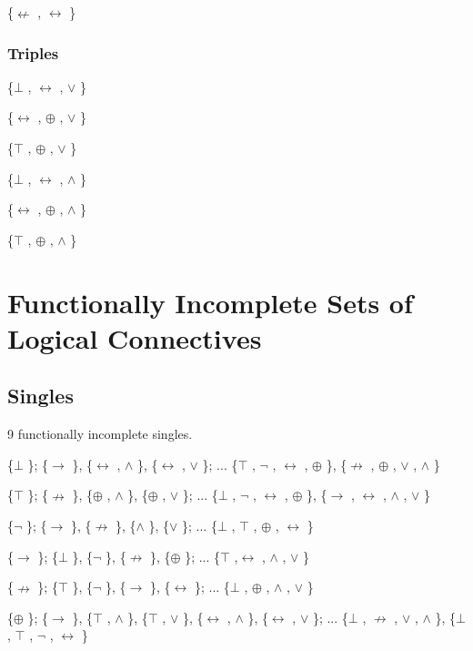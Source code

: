 \{$\nleftarrow$ , $\leftrightarrow$ \}

\hypertarget{triples}{%
\subsubsection{Triples}\label{triples}}

\{$\bot$ , $\leftrightarrow$ , $\lor$ \}

\{$\leftrightarrow$ , $\oplus$ , $\lor$ \}

\{$\top$ , $\oplus$ , $\lor$ \}

\{$\bot$ , $\leftrightarrow$ , $\land$ \}

\{$\leftrightarrow$ , $\oplus$ , $\land$ \}

\{$\top$ , $\oplus$ , $\land$ \}

\hypertarget{functionally-incomplete-sets-of-logical-connectives}{%
\section{Functionally Incomplete Sets of Logical
Connectives}\label{functionally-incomplete-sets-of-logical-connectives}}

\hypertarget{singles-1}{%
\subsection{Singles}\label{singles-1}}

9 functionally incomplete singles.

\{$\bot$ \}; \{$\to$ \}, \{$\leftrightarrow$ , $\land$ \}, \{$\leftrightarrow$ , $\lor$ \}; ... \{$\top$ , $\neg$ , $\leftrightarrow$ , $\oplus$ \}, \{$\nrightarrow$ , $\oplus$ , $\lor$ , $\land$ \}

\{$\top$ \}; \{$\nrightarrow$ \}, \{$\oplus$ , $\land$ \}, \{$\oplus$ , $\lor$ \}; ... \{$\bot$ , $\neg$ , $\leftrightarrow$ , $\oplus$ \}, \{$\to$ , $\leftrightarrow$ , $\land$ , $\lor$ \}

\{$\neg$ \}; \{$\to$ \}, \{$\nrightarrow$ \}, \{$\land$ \}, \{$\lor$ \}; ... \{$\bot$ , $\top$ , $\oplus$ , $\leftrightarrow$ \}

\{$\to$ \}; \{$\bot$ \}, \{$\neg$ \}, \{$\nrightarrow$ \}, \{$\oplus$ \}; ... \{$\top$ ,$\leftrightarrow$ , $\land$ , $\lor$ \}

\{$\nrightarrow$ \}; \{$\top$ \}, \{$\neg$ \}, \{$\to$ \}, \{$\leftrightarrow$ \}; ... \{$\bot$ , $\oplus$ , $\land$ , $\lor$ \}

\{$\oplus$ \}; \{$\to$ \}, \{$\top$ , $\land$ \}, \{$\top$ , $\lor$ \}, \{$\leftrightarrow$ , $\land$ \}, \{$\leftrightarrow$ , $\lor$ \}; ... \{$\bot$ , $\nrightarrow$ , $\lor$ ,
$\land$ \}, \{$\bot$ , $\top$ , $\neg$ , $\leftrightarrow$ \}

